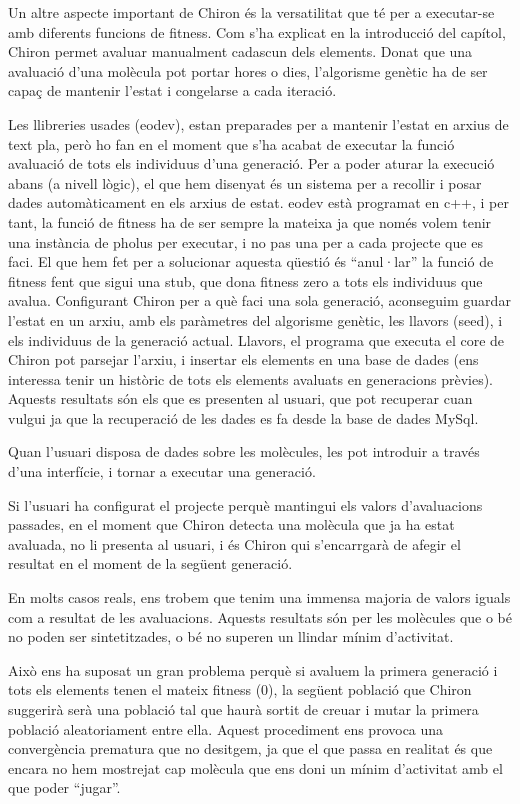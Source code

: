 \documentclass[titlepage,a4paper,12pt]{book}
\begin{document}
Un altre aspecte important de Chiron és la versatilitat que té per a executar-se
amb diferents funcions de fitness.  Com s'ha explicat en la introducció del
capítol, Chiron permet avaluar manualment cadascun dels elements.  Donat que una
avaluació d'una molècula pot portar hores o dies, l'algorisme genètic ha de ser
capaç de mantenir l'estat i congelarse a cada iteració.

Les llibreries usades (eodev), estan preparades per a mantenir l'estat en arxius
de text pla, però ho fan en el moment que s'ha acabat de executar la funció
avaluació de tots els individuus d'una generació.  Per a poder aturar la
execució abans (a nivell lògic), el que hem disenyat és un sistema per a
recollir i posar dades automàticament en els arxius de estat.  eodev està
programat en c++, i per tant, la funció de fitness ha de ser sempre la mateixa
ja que només volem tenir una instància de pholus per executar, i no pas una per
a cada projecte que es faci.  El que hem fet per a solucionar aquesta qüestió és
``anul·lar'' la funció de fitness fent que sigui una stub, que dona fitness zero
a tots els individuus que avalua.  Configurant Chiron per a què faci una sola
generació, aconseguim guardar l'estat en un arxiu, amb els paràmetres del
algorisme genètic, les llavors (seed), i els individuus de la generació actual.
Llavors, el programa que executa el core de Chiron pot parsejar l'arxiu, i
insertar els elements en una base de dades (ens interessa tenir un històric de
tots els elements avaluats en generacions prèvies).  Aquests resultats són els
que es presenten al usuari, que pot recuperar cuan vulgui ja que la recuperació
de les dades es fa desde la base de dades MySql.

Quan l'usuari disposa de dades sobre les molècules, les pot introduir a través
d'una interfície, i tornar a executar una generació.

Si l'usuari ha configurat el projecte perquè mantingui els valors d'avaluacions
passades, en el moment que Chiron detecta una molècula que ja ha estat avaluada,
no li presenta al usuari, i és Chiron qui s'encarrgarà de afegir el resultat en
el moment de la següent generació.


En  molts casos reals, ens trobem que tenim una immensa majoria de valors iguals
com a resultat de les avaluacions.  Aquests resultats són per les molècules que
o bé no poden ser sintetitzades, o bé no superen un llindar mínim d'activitat.

Això ens ha suposat un gran problema perquè si avaluem la primera generació i
tots els elements tenen el mateix fitness (0), la següent població que Chiron
suggerirà serà una població tal que haurà sortit de creuar i mutar la primera
població aleatoriament entre ella.  Aquest procediment ens provoca una
convergència prematura que no desitgem, ja que el que passa en realitat és que
encara no hem mostrejat cap molècula que ens doni un mínim d'activitat amb el
que poder ``jugar''.
\end{document}
